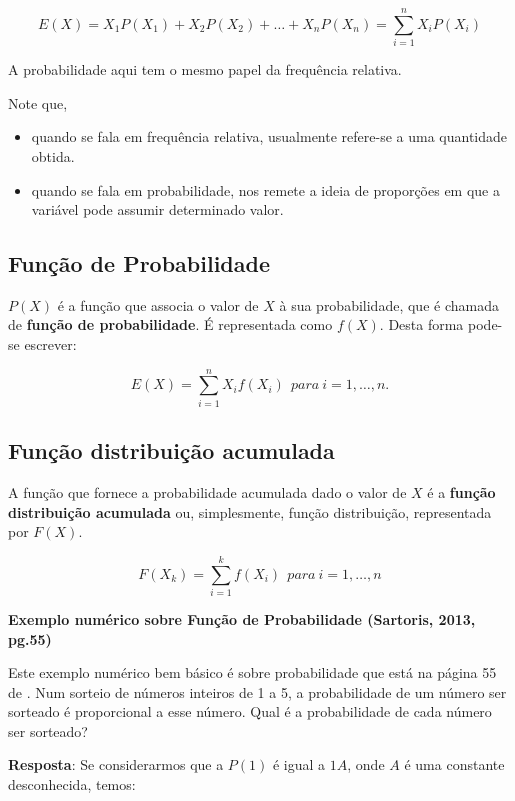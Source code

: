 \documentclass[
]{book}
\providecommand{\tightlist}{%
  \setlength{\itemsep}{0pt}\setlength{\parskip}{0pt}}
\begin{document}
\[
  E(X) = X_1P(X_1) + X_2P(X_2) + \ldots + X_nP(X_n) = \sum_{i=1}^{n}X_iP(X_i)
\]

A probabilidade aqui tem o mesmo papel da frequência relativa.

Note que,

\begin{itemize}
\tightlist
\item
  quando se fala em frequência relativa, usualmente refere-se a
  uma quantidade obtida.
\item
  quando se fala em probabilidade, nos remete a ideia de proporções em que
  a variável pode assumir determinado valor.
\end{itemize}

\hypertarget{funuxe7uxe3o-de-probabilidade}{%
\subsection{Função de Probabilidade}\label{funuxe7uxe3o-de-probabilidade}}

\(P(X)\) é a função que associa o valor de \(X\) à sua probabilidade, que é chamada
de \textbf{função de probabilidade}. É representada como \(f(X)\).
Desta forma pode-se escrever:

\[
E(X) = \sum_ {i=1}^{n}X_i f(X_i)~~para~i=1,\ldots,n.
\]

\hypertarget{funuxe7uxe3o-distribuiuxe7uxe3o-acumulada}{%
\subsection{Função distribuição acumulada}\label{funuxe7uxe3o-distribuiuxe7uxe3o-acumulada}}

A função que fornece a probabilidade acumulada dado o valor de \(X\) é a
\textbf{função distribuição acumulada} ou, simplesmente, função distribuição,
representada por \(F(X)\).

\[
F(X_k) = \sum_{i=1}^{k} f(X_i)~~para~i=1, \ldots,n
\]

\textbf{Exemplo numérico sobre Função de Probabilidade (Sartoris, 2013, pg.55)}

Este exemplo numérico bem básico é sobre probabilidade que está na página 55 de
\citet{Sartoris2013}.
Num sorteio de números inteiros de 1 a 5, a probabilidade de um número ser sorteado é proporcional a esse número. Qual é a probabilidade de cada número ser sorteado?

\textbf{Resposta}: Se considerarmos que a \(P(1)\) é igual a \(1A\), onde \(A\) é uma constante desconhecida, temos:
\end{document}
